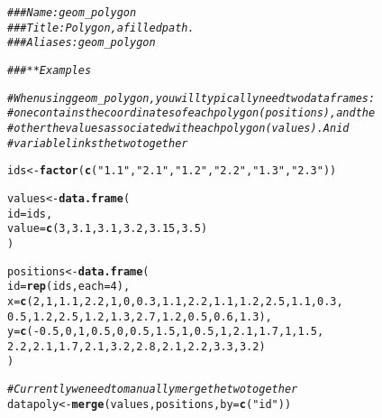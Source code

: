 \documentclass[a4paper,titlepage]{tufte-handout}\usepackage[]{graphicx}\usepackage[]{color}
\makeatletter
\newcommand{\hlnum}[1]{\textcolor[rgb]{0.686,0.059,0.569}{#1}}%
\newcommand{\hlstr}[1]{\textcolor[rgb]{0.192,0.494,0.8}{#1}}%
\newcommand{\hlcom}[1]{\textcolor[rgb]{0.678,0.584,0.686}{\textit{#1}}}%
\newcommand{\hlopt}[1]{\textcolor[rgb]{0,0,0}{#1}}%
\newcommand{\hlstd}[1]{\textcolor[rgb]{0.345,0.345,0.345}{#1}}%
\newcommand{\hlkwb}[1]{\textcolor[rgb]{0.69,0.353,0.396}{#1}}%
\newcommand{\hlkwc}[1]{\textcolor[rgb]{0.333,0.667,0.333}{#1}}%
\newcommand{\hlkwd}[1]{\textcolor[rgb]{0.737,0.353,0.396}{\textbf{#1}}}%
\newenvironment{kframe}{%
 \def\at@end@of@kframe{}%
 \ifinner\ifhmode%
  \def\at@end@of@kframe{\end{minipage}}%
  \begin{minipage}{\columnwidth}%
 \fi\fi%
 \def\FrameCommand##1{\hskip\@totalleftmargin \hskip-\fboxsep
 \colorbox{shadecolor}{##1}\hskip-\fboxsep
     \hskip-\linewidth \hskip-\@totalleftmargin \hskip\columnwidth}%
 \MakeFramed {\advance\hsize-\width
   \@totalleftmargin\z@ \linewidth\hsize
   \@setminipage}}%
 {\par\unskip\endMakeFramed%
 \at@end@of@kframe}
\newenvironment{knitrout}{}{} %
\makeatother
\begin{document}
\begin{knitrout}
\color{fgcolor}\begin{kframe}
\begin{alltt}
\hlcom{### Name: geom_polygon}
\hlcom{### Title: Polygon, a filled path.}
\hlcom{### Aliases: geom_polygon}

\hlcom{### ** Examples}

\hlcom{# When using geom_polygon, you will typically need two data frames:}
\hlcom{# one contains the coordinates of each polygon (positions),  and the}
\hlcom{# other the values associated with each polygon (values).  An id}
\hlcom{# variable links the two together}

\hlstd{ids} \hlkwb{<-} \hlkwd{factor}\hlstd{(}\hlkwd{c}\hlstd{(}\hlstr{"1.1"}\hlstd{,} \hlstr{"2.1"}\hlstd{,} \hlstr{"1.2"}\hlstd{,} \hlstr{"2.2"}\hlstd{,} \hlstr{"1.3"}\hlstd{,} \hlstr{"2.3"}\hlstd{))}

\hlstd{values} \hlkwb{<-} \hlkwd{data.frame}\hlstd{(}
  \hlkwc{id} \hlstd{= ids,}
  \hlkwc{value} \hlstd{=} \hlkwd{c}\hlstd{(}\hlnum{3}\hlstd{,} \hlnum{3.1}\hlstd{,} \hlnum{3.1}\hlstd{,} \hlnum{3.2}\hlstd{,} \hlnum{3.15}\hlstd{,} \hlnum{3.5}\hlstd{)}
\hlstd{)}

\hlstd{positions} \hlkwb{<-} \hlkwd{data.frame}\hlstd{(}
  \hlkwc{id} \hlstd{=} \hlkwd{rep}\hlstd{(ids,} \hlkwc{each} \hlstd{=} \hlnum{4}\hlstd{),}
  \hlkwc{x} \hlstd{=} \hlkwd{c}\hlstd{(}\hlnum{2}\hlstd{,} \hlnum{1}\hlstd{,} \hlnum{1.1}\hlstd{,} \hlnum{2.2}\hlstd{,} \hlnum{1}\hlstd{,} \hlnum{0}\hlstd{,} \hlnum{0.3}\hlstd{,} \hlnum{1.1}\hlstd{,} \hlnum{2.2}\hlstd{,} \hlnum{1.1}\hlstd{,} \hlnum{1.2}\hlstd{,} \hlnum{2.5}\hlstd{,} \hlnum{1.1}\hlstd{,} \hlnum{0.3}\hlstd{,}
  \hlnum{0.5}\hlstd{,} \hlnum{1.2}\hlstd{,} \hlnum{2.5}\hlstd{,} \hlnum{1.2}\hlstd{,} \hlnum{1.3}\hlstd{,} \hlnum{2.7}\hlstd{,} \hlnum{1.2}\hlstd{,} \hlnum{0.5}\hlstd{,} \hlnum{0.6}\hlstd{,} \hlnum{1.3}\hlstd{),}
  \hlkwc{y} \hlstd{=} \hlkwd{c}\hlstd{(}\hlopt{-}\hlnum{0.5}\hlstd{,} \hlnum{0}\hlstd{,} \hlnum{1}\hlstd{,} \hlnum{0.5}\hlstd{,} \hlnum{0}\hlstd{,} \hlnum{0.5}\hlstd{,} \hlnum{1.5}\hlstd{,} \hlnum{1}\hlstd{,} \hlnum{0.5}\hlstd{,} \hlnum{1}\hlstd{,} \hlnum{2.1}\hlstd{,} \hlnum{1.7}\hlstd{,} \hlnum{1}\hlstd{,} \hlnum{1.5}\hlstd{,}
  \hlnum{2.2}\hlstd{,} \hlnum{2.1}\hlstd{,} \hlnum{1.7}\hlstd{,} \hlnum{2.1}\hlstd{,} \hlnum{3.2}\hlstd{,} \hlnum{2.8}\hlstd{,} \hlnum{2.1}\hlstd{,} \hlnum{2.2}\hlstd{,} \hlnum{3.3}\hlstd{,} \hlnum{3.2}\hlstd{)}
\hlstd{)}

\hlcom{# Currently we need to manually merge the two together}
\hlstd{datapoly} \hlkwb{<-} \hlkwd{merge}\hlstd{(values, positions,} \hlkwc{by}\hlstd{=}\hlkwd{c}\hlstd{(}\hlstr{"id"}\hlstd{))}


\end{alltt}
\end{kframe}
\end{knitrout}
\end{document}
